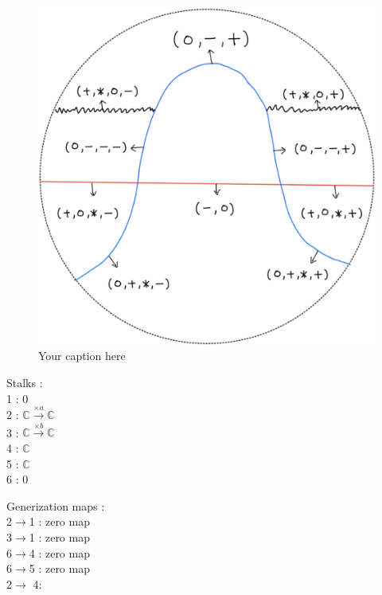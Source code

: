 \begin{figure}[H] %
    \centering
    \includegraphics[scale = 0.95]{diagrams/lemma2/2.png} %
    \caption{Your caption here}
    \label{fig:your-label}
\end{figure}

Stalks : \\
1 : 0 \\
2 : $\mathbb{C}\xrightarrow{\times a}\mathbb{C}$\\
3 : $\mathbb{C}\xrightarrow{\times b}\mathbb{C}$\\
4 : $\mathbb{C}$ \\
5 : $\mathbb{C}$ \\
6 : 0

Generization maps : \\

2$\rightarrow$1 : zero map \\
3$\rightarrow$1 : zero map \\
6$\rightarrow$4 : zero map \\
6$\rightarrow$5 : zero map \\
2$\rightarrow$ 4: 
\\

